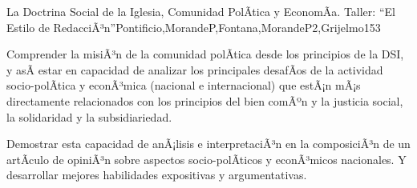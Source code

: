 \begin{syllabus}
\begin{unit}{La Doctrina Social de la Iglesia, Comunidad PolÃ­tica y EconomÃ­a. Taller: ``El Estilo de RedacciÃ³n''}{Pontificio,MorandeP,Fontana,MorandeP2,Grijelmo}{15}{3}
\begin{topics}
\end{topics}
\begin{unitgoals}
	\item Comprender la misiÃ³n de la comunidad polÃ­tica desde los principios de la DSI, y asÃ­ estar en capacidad de analizar los principales desafÃ­os de la actividad socio-polÃ­tica y econÃ³mica (nacional e internacional) que estÃ¡n mÃ¡s directamente relacionados con los principios del bien comÃºn y la justicia social, la solidaridad y la subsidiariedad.
	\item Demostrar esta capacidad de anÃ¡lisis e interpretaciÃ³n en la composiciÃ³n de un artÃ­culo de opiniÃ³n sobre aspectos socio-polÃ­ticos y econÃ³micos nacionales. Y desarrollar mejores habilidades expositivas y argumentativas.
\end{unitgoals}
\end{unit}



\begin{coursebibliography}
\end{coursebibliography}
\end{syllabus}
